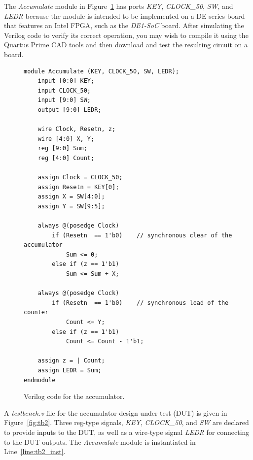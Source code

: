 \documentclass[11pt, twoside, pdftex]{article}
\begin{document}
\noindent
The {\it Accumulate} module in Figure~\ref{fig:accumulate} has ports {\it KEY}, 
{\it CLOCK\_50}, {\it SW}, and {\it LEDR} because the module is intended to be implemented
on a DE-series board that features an Intel FPGA, such as the {\it DE1-SoC} board. After 
simulating the Verilog code to verify its correct operation, you may
wish to compile it using the Quartus Prime CAD tools and then download and test the 
resulting circuit on a board.  

\lstset{language=Verilog,numbers=none,escapechar=?}
\begin{figure}[bh!]
\begin{center}
\begin{minipage}[t]{15 cm}
\begin{lstlisting}[name=accumulate]
module Accumulate (KEY, CLOCK_50, SW, LEDR);
    input [0:0] KEY;
    input CLOCK_50;
    input [9:0] SW;
    output [9:0] LEDR;

    wire Clock, Resetn, z;
    wire [4:0] X, Y;
    reg [9:0] Sum;
    reg [4:0] Count;

    assign Clock = CLOCK_50;
    assign Resetn = KEY[0];
    assign X = SW[4:0];
    assign Y = SW[9:5];

    always @(posedge Clock)
        if (Resetn  == 1'b0)    // synchronous clear of the accumulator
            Sum <= 0;
        else if (z == 1'b1)
            Sum <= Sum + X;

    always @(posedge Clock)
        if (Resetn  == 1'b0)    // synchronous load of the counter
            Count <= Y;
        else if (z == 1'b1)
            Count <= Count - 1'b1;

    assign z = | Count;
    assign LEDR = Sum;
endmodule
\end{lstlisting}
\end{minipage}
\caption{Verilog code for the accumulator.}
\label{fig:accumulate}
\end{center}
\end{figure}

\noindent
A {\it testbench.v} file for the accumulator design under test (DUT) is given in 
Figure~\ref{fig:tb2}. Three reg-type signals, {\it KEY}, {\it CLOCK\_50}, and 
{\it SW} are declared to provide inputs to the DUT, as well as a wire-type signal {\it LEDR}
for connecting to the DUT outputs. The {\it Accumulate} module is instantiated in
Line~\ref{line:tb2_inst}.
\end{document}
